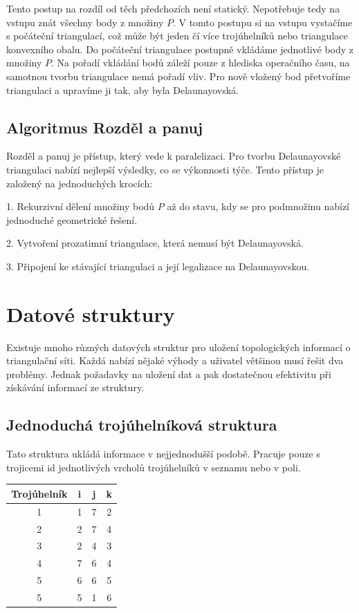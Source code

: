 \documentclass[12pt,a4paper]{article}
\begin{document}
Tento postup na rozdíl od těch předchozích není statický. Nepotřebuje tedy na vstupu znát všechny body z množiny $P$. V tomto postupu si na vstupu vystačíme s počáteční triangulací, což může být jeden čí více trojúhelníků nebo triangulace konvexního obalu. Do počáteční triangulace postupně vkládáme jednotlivé body z množiny $P$. Na pořadí vkládání bodů záleží pouze z hlediska operačního času, na samotnou tvorbu triangulace nemá pořadí vliv. Pro nově vložený bod přetvoříme triangulaci a upravíme ji tak, aby byla Delaunayovská. 

\subsection{Algoritmus Rozděl a panuj}

Rozděl a panuj je přístup, který vede k paralelizaci. Pro tvorbu Delaunayovské triangulaci nabízí nejlepší výsledky, co se výkonnosti týče. Tento přístup je založený na jednoduchých krocích:

1. Rekurzivní dělení množiny bodů $P$ až do stavu, kdy se pro podmnožinu nabízí jednoduché geometrické řešení.

2. Vytvoření prozatimní triangulace, která nemusí být Delaunayovská.

3. Připojení ke stávající triangulaci a její legalizace na Delaunayovskou.


\newpage
\section{Datové struktury}

Existuje mnoho různých datových struktur pro uložení topologických informací o triangulační síti. Každá nabízí nějaké výhody a uživatel většinou musí řešit dva problémy. Jednak požadavky na uložení dat a pak dostatečnou efektivitu při získávání informací ze struktury.


\subsection{Jednoduchá trojúhelníková struktura}
Tato struktura ukládá informace v nejjednodušší podobě. Pracuje pouze s trojicemi id jednotlivých vrcholů trojúhelníků v seznamu nebo v poli.

\begin{tabular}{|c||c|c|c|}
\hline
Trojúhelník & i & j & k\\
\hline
1 & 1 & 7 & 2\\
2 & 2 & 7 & 4\\
3 & 2 & 4 & 3\\
4 & 7 & 6 & 4\\
5 & 6 & 6 & 5\\
5 & 5 & 1 & 6\\
\hline
\end{tabular}
\end{document}
